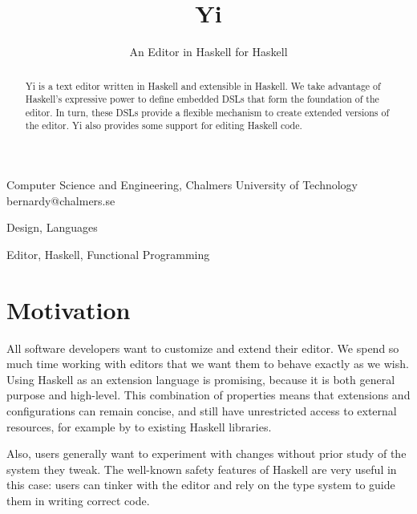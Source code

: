 \documentclass[9pt,indentedstyle,preprint]{sigplanconf}
\begin{document}
\copyrightdata{[to be supplied]} 


\title{Yi}
\subtitle{An Editor in Haskell for Haskell}

           {Computer Science and Engineering, 
            Chalmers University of Technology
          }
           {bernardy@chalmers.se}

\maketitle

\begin{abstract}
  Yi is a text editor written in Haskell and extensible in Haskell. We take
  advantage of Haskell's expressive power to define embedded DSLs that form the
  foundation of the editor. In turn, these DSLs provide a flexible
  mechanism to create extended versions of the editor. Yi also
  provides some support for editing Haskell code.
\end{abstract}


\terms
Design, Languages

\keywords
Editor, Haskell, Functional Programming

\section{Motivation}

All software developers want to customize and extend their editor. We
spend so much time working with editors that we want them to behave
exactly as we wish.  Using Haskell as an extension language is
promising, because it is both general purpose and high-level. This
combination of properties means that extensions and configurations can remain
concise, and still have unrestricted access to external resources, for
example by to existing Haskell libraries.

Also, users generally want to experiment with changes without prior
study of the system they tweak. The well-known safety features of
Haskell are very useful in this case: users can tinker with the editor
and rely on the type system to guide them in writing correct code.
\end{document}
